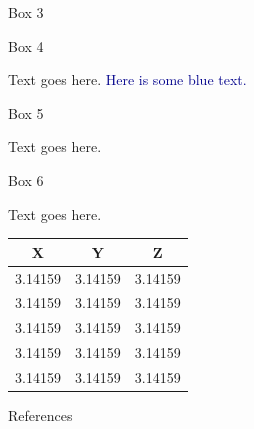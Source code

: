 \documentclass[a0paper,portrait]{baposter}
\begin{document}
\begin{poster}
\begin{posterbox}[name=box3,column=1,below=box1, height=0.315]{Box 3}
\end{posterbox}





\begin{posterbox}[name=box4,column=2,below=box1, height=0.315]{Box 4}

Text goes here. \textcolor{darkblue}{Here is some blue text.}



\end{posterbox}





\begin{posterbox}[name=box5,span=2,column=0,below=box2, height=0.5411]{Box 5}

Text goes here. 


\end{posterbox}





\begin{posterbox}[name=box6,column=2,below=box4, height=0.282]{Box 6}

Text goes here.

\vspace{-1.5ex}
\begin{center}
\setlength{\tabcolsep}{18pt}
\begin{tabular}{ccc}
\hline
X  & Y & Z \\
\hline
3.14159 & 3.14159 & 3.14159 \\
3.14159 & 3.14159 & 3.14159 \\
3.14159 & 3.14159 & 3.14159 \\
3.14159 & 3.14159 & 3.14159 \\
3.14159 & 3.14159 & 3.14159 \\
\hline
\end{tabular}
\label{table:tablelab}
\end{center}


\end{posterbox}




\begin{posterbox}[name=refs,column=2,below=box6, height=0.158]{References}
\vspace{-0.3em}



\end{posterbox}
\end{poster}
\end{document}

